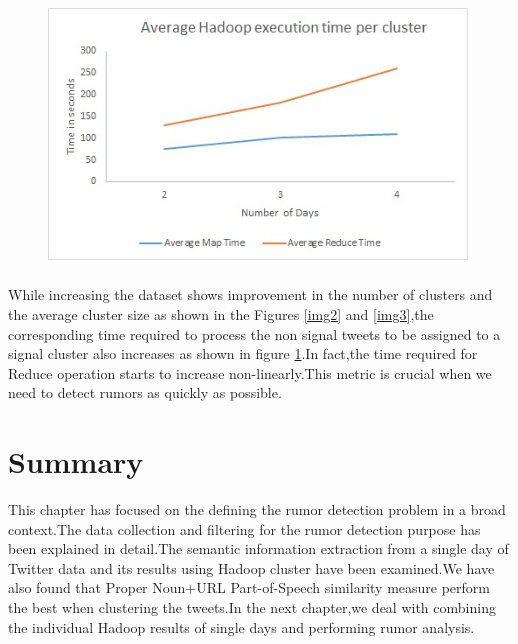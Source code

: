 		\begin{figure}[H]
									\centering	
									\begin{minipage}{.7\linewidth}
										\includegraphics[width=\linewidth]{images/result4new.jpg}
										\label{img4}
										\end{minipage}
		\end{figure}
										

		While increasing the dataset shows improvement in the number of clusters and the average cluster size as shown in the Figures  \ref{img2} and \ref{img3},the corresponding time required to process the non signal tweets to be assigned to a signal cluster also increases as shown in figure \ref{img4}.In fact,the time required for Reduce operation starts to increase non-linearly.This metric is crucial when we need to detect rumors as quickly as possible.
		
		\section {Summary}
		
		This chapter has focused on the defining the rumor detection problem in a broad context.The data collection and filtering for the rumor detection purpose has been explained in detail.The semantic information extraction from a single day of Twitter data and its results using Hadoop cluster have been examined.We have also found that Proper Noun+URL Part-of-Speech similarity measure perform the best when clustering the tweets.In the next chapter,we deal with combining the individual Hadoop results of single days and performing rumor analysis.
		
	